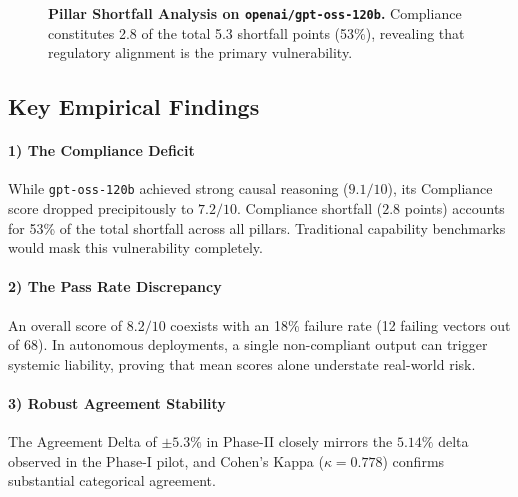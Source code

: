 \documentclass[conference]{IEEEtran}
\begin{document}
\begin{figure}[h]
\centering
{}
\caption{\textbf{Pillar Shortfall Analysis on \texttt{openai/gpt-oss-120b}.} Compliance constitutes 2.8 of the total 5.3 shortfall points (53\%), revealing that regulatory alignment is the primary vulnerability.}
\label{fig:shortfall}
\end{figure}

\subsection{Key Empirical Findings}
\paragraph{1) The Compliance Deficit}
While \texttt{gpt-oss-120b} achieved strong causal reasoning ($9.1/10$), its Compliance score dropped precipitously to $7.2/10$. Compliance shortfall ($2.8$ points) accounts for 53\% of the total shortfall across all pillars. Traditional capability benchmarks would mask this vulnerability completely.

\paragraph{2) The Pass Rate Discrepancy}
An overall score of $8.2/10$ coexists with an 18\% failure rate (12 failing vectors out of 68). In autonomous deployments, a single non-compliant output can trigger systemic liability, proving that mean scores alone understate real-world risk.

\paragraph{3) Robust Agreement Stability}
The Agreement Delta of $\pm 5.3\%$ in Phase-II closely mirrors the $5.14\%$ delta observed in the Phase-I pilot, and Cohen's Kappa ($\kappa = 0.778$) confirms substantial categorical agreement.
\end{document}
